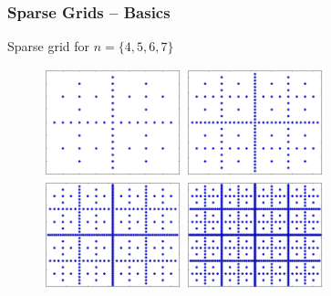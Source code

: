 \begin{frame}
  \frametitle{Sparse Grids -- Basics}
  \topline
  \vspace{-10px}
  \begin{block}{Sparse grid for $n = \{4,5,6,7\}$}
    \begin{figure}[!htp]
      \centering
      \includegraphics[width=4cm]{images/sparsegrid_d4}
      \includegraphics[width=4cm]{images/sparsegrid_d5}
      \\
      \includegraphics[width=4cm]{images/sparsegrid_d6}
      \includegraphics[width=4cm]{images/sparsegrid_d7}
      \vspace{-12px}
      \caption{}
    \end{figure}
  \end{block}
\end{frame}


